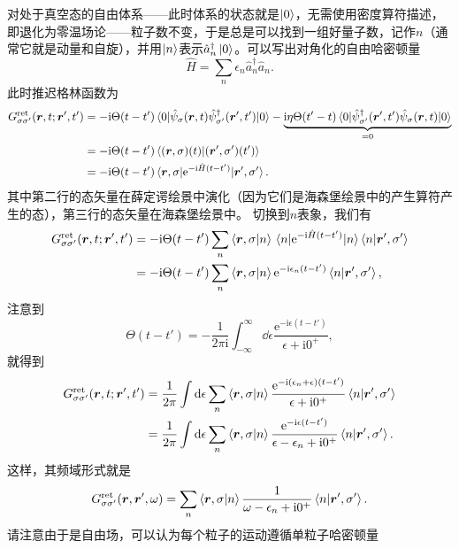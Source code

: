 \documentclass[hyperref, UTF8, a4paper]{ctexart}
\newcommand*{\ii}{\mathrm{i}}
\newcommand*{\ee}{\mathrm{e}}
\begin{document}
对处于真空态的自由体系——此时体系的状态就是$\ket{0}$，无需使用密度算符描述，即退化为零温场论——粒子数不变，于是总是可以找到一组好量子数，记作$n$（通常它就是动量和自旋），并用$\ket{n}$表示$\hat{a}_n^\dagger\ket{0}$。可以写出对角化的自由哈密顿量
\[
    \hat{H} = \sum_n \epsilon_n \hat{a}_n^\dagger \hat{a}_n.
\]
此时推迟格林函数为
\[
    \begin{aligned}
        G^\text{ret}_{\sigma \sigma'} (\vb*{r}, t; \vb*{r}', t') &= - \ii \Theta(t-t') \mel{0}{\hat{\psi}_\sigma(\vb*{r}, t) \hat{\psi}^\dagger_{\sigma'}(\vb*{r}', t')}{0} - \underbrace{\ii \eta \Theta(t'-t) \mel{0}{\hat{\psi}^\dagger_{\sigma'}(\vb*{r}', t') \hat{\psi}_\sigma(\vb*{r}, t)}{0}}_{=0} \\
        &= - \ii \Theta(t-t') \braket{(\vb*{r}, \sigma) (t)}{(\vb*{r}', \sigma')(t')} \\
        &= - \ii \Theta(t-t') \mel{\vb*{r}, \sigma}{\ee^{-\ii \hat{H} (t-t')}}{\vb*{r}', \sigma'}.
    \end{aligned}
\]
其中第二行的态矢量在薛定谔绘景中演化（因为它们是海森堡绘景中的产生算符产生的态），第三行的态矢量在海森堡绘景中。
切换到$n$表象，我们有
\[
    \begin{aligned}
        G^\text{ret}_{\sigma \sigma'} (\vb*{r}, t; \vb*{r}', t') &= - \ii \Theta(t-t') \sum_n \braket{\vb*{r}, \sigma}{n} \mel{n}{\ee^{-\ii \hat{H} (t-t')}}{n} \braket{n}{\vb*{r}', \sigma'} \\
        &= - \ii \Theta(t-t') \sum_n \braket{\vb*{r}, \sigma}{n} \ee^{-\ii \epsilon_n (t-t')} \braket{n}{\vb*{r}', \sigma'},
    \end{aligned}
\]
注意到
\[
    \Theta (t-t') = - \frac{1}{2\pi \ii} \int_{-\infty}^\infty \dd{\epsilon} \frac{ \ee^{ - \ii \epsilon (t-t')}}{\epsilon + \ii 0^+},
\]
就得到
\[
    \begin{aligned}
        G^\text{ret}_{\sigma \sigma'} (\vb*{r}, t; \vb*{r}', t') &= \frac{1}{2\pi} \int \dd{\epsilon} \sum_n \braket{\vb*{r}, \sigma}{n} \frac{\ee^{-\ii (\epsilon_n + \epsilon) (t-t')}}{\epsilon + \ii 0^+} \braket{n}{\vb*{r}', \sigma'} \\
        &= \frac{1}{2\pi} \int \dd{\epsilon} \sum_n \braket{\vb*{r}, \sigma}{n} \frac{\ee^{-\ii \epsilon (t-t')}}{\epsilon - \epsilon_n + \ii 0^+} \braket{n}{\vb*{r}', \sigma'}.
    \end{aligned}
\]
这样，其频域形式就是
\[
    G^\text{ret}_{\sigma \sigma'}(\vb*{r}, \vb*{r}', \omega) = \sum_n \braket{\vb*{r}, \sigma}{n} \frac{1}{\omega - \epsilon_n + \ii 0^+} \braket{n}{\vb*{r}', \sigma'}.
\]
请注意由于是自由场，可以认为每个粒子的运动遵循单粒子哈密顿量%
\end{document}
